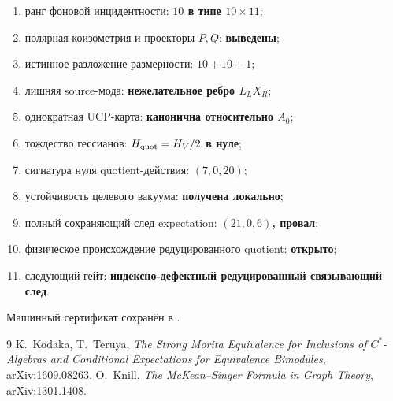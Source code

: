 \begin{protocol}
\begin{enumerate}
 \item ранг фоновой инцидентности: \textbf{$10$ в типе $10\times11$};
 \item полярная коизометрия и проекторы $P,Q$: \textbf{выведены};
 \item истинное разложение размерности: \textbf{$10+10+1$};
 \item лишняя source-мода: \textbf{нежелательное ребро $L_LX_R$};
 \item однократная UCP-карта: \textbf{канонична относительно $A_0$};
 \item тождество гессианов: \textbf{$H_{\rm quot}=H_V/2$ в нуле};
 \item сигнатура нуля quotient-действия: \textbf{$(7,0,20)$};
 \item устойчивость целевого вакуума: \textbf{получена локально};
 \item полный сохраняющий след expectation: \textbf{$(21,0,6)$, провал};
 \item физическое происхождение редуцированного quotient: \textbf{открыто};
 \item следующий гейт: \textbf{индексно-дефектный редуцированный
 связывающий след}.
\end{enumerate}
\end{protocol}

Машинный сертификат сохранён в
.

\begin{thebibliography}{9}
K.~Kodaka, T.~Teruya,
\emph{The Strong Morita Equivalence for Inclusions of $C^*$-Algebras and
Conditional Expectations for Equivalence Bimodules},
arXiv:1609.08263.
O.~Knill,
\emph{The McKean--Singer Formula in Graph Theory},
arXiv:1301.1408.
\end{thebibliography}